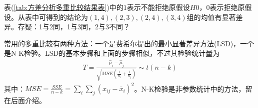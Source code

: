         表(\ref{tab:方差分析多重比较结果表})中的$1$表示不能拒绝原假设$H0$，$0$表示拒绝原假设。从表中可得到的结论为$(1,4),(2,3),(2,4),(3,4)$组的均值有显著差异。存疑：1与2同，1与3同，2与3不同？
        \par
        常用的多重比较有两种方法：一个是费希尔提出的最小显著差异方法(LSD)，一个是N-K检验。LSD的基本步骤和上面的步骤相似，不过其检验统计量为
        \begin{align*}
        T = \frac{\hat{\mu}_i - \hat{\mu}_j}{\sqrt{MSE \left( \frac{1}{n_i}+ \frac{1}{n_j} \right) }} \sim t(n-k)
        \end{align*}
        其中：$MSE = \frac{SSE}{n-k} = \sum_i\sum_j(x_{ij} - \bar{x}_i)^2$。N-K检验是非参数统计中的方法，留在后面介绍。


